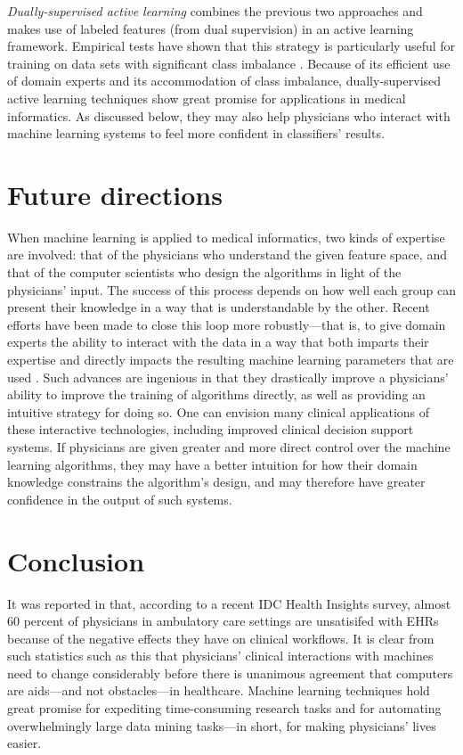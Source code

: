 \documentclass[12pt]{article} %
\begin{document}
\textit{Dually-supervised active learning} combines the previous two approaches and makes use of labeled features (from dual supervision) in an active learning framework. Empirical tests have shown that this strategy is particularly useful for training on data sets with significant class imbalance \cite{wallace2012}. Because of its efficient use of domain experts and its accommodation of class imbalance, dually-supervised active learning techniques show great promise for applications in medical informatics. As discussed below, they may also help physicians who interact with machine learning systems to feel more confident in classifiers' results.




\section{Future directions}
When machine learning is applied to medical informatics, two kinds of expertise are involved: that of the physicians who understand the given feature space, and that of the computer scientists who design the algorithms in light of the physicians' input. The success of this process depends on how well each group can present their knowledge in a way that is understandable by the other. Recent efforts have been made to close this loop more robustly---that is, to give domain experts the ability to interact with the data in a way that both imparts their expertise and directly impacts the resulting machine learning parameters that are used \cite{brown2012, liu2011}. Such advances are ingenious in that they drastically improve a physicians' ability to improve the training of algorithms directly, as well as providing an intuitive strategy for doing so. One can envision many clinical applications of these interactive technologies, including improved clinical decision support systems. If physicians are given greater and more direct control over the machine learning algorithms, they may have a better intuition for how their domain knowledge constrains the algorithm's design, and may therefore have greater confidence in the output of such systems.



\section{Conclusion}
It was reported in \cite{miliard2013} that, according to a recent IDC Health Insights survey, almost 60 percent of physicians in ambulatory care settings are unsatisifed with EHRs because of the negative effects they have on clinical workflows.
It is clear from such statistics such as this that physicians' clinical interactions with machines need to change considerably before there is unanimous agreement that computers are aids---and not obstacles---in healthcare.
Machine learning techniques hold great promise for expediting time-consuming research tasks and for automating overwhelmingly large data mining tasks---in short, for making physicians' lives easier.
\end{document}
